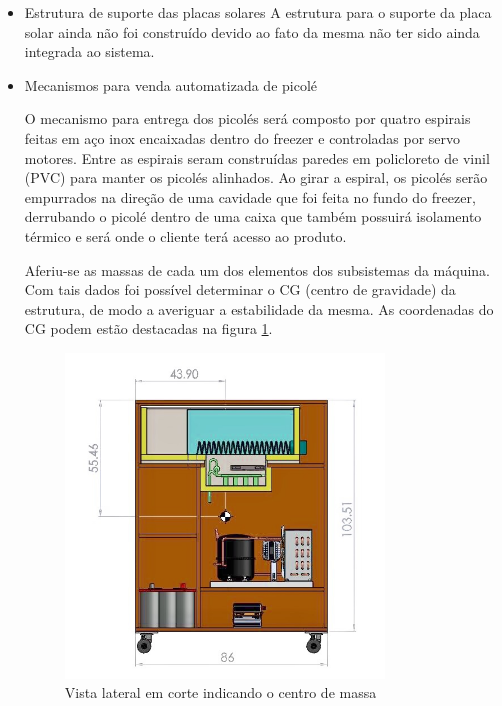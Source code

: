  \begin{itemize}
\item Estrutura de suporte das placas solares
A estrutura para o suporte da placa solar ainda não foi construído devido ao fato da mesma não ter sido ainda integrada ao sistema. 
\item Mecanismos para venda automatizada de picolé

O mecanismo para entrega dos picolés será composto por quatro espirais feitas em aço inox encaixadas dentro do freezer e controladas por servo motores. Entre as espirais seram construídas paredes em policloreto de vinil (PVC) para manter os picolés alinhados. Ao girar a espiral, os picolés serão empurrados na direção de uma cavidade que foi feita no fundo do freezer, derrubando o picolé dentro de uma caixa que também possuirá isolamento térmico e será onde o cliente terá acesso ao produto. 

Aferiu-se as massas de cada um dos elementos dos subsistemas da máquina. Com tais dados foi possível determinar o CG (centro de gravidade) da estrutura, de modo a averiguar a estabilidade da mesma. As coordenadas do CG podem estão destacadas na figura \ref{fig:cad_vista_lateral}.

   \begin{figure}[H]
	\centering
    \includegraphics[width=0.8\textwidth]{figuras/cad_vista_lateral}
    \caption{Vista lateral em corte indicando o centro de massa}
    \label{fig:cad_vista_lateral}
\end{figure}


\end{itemize}

